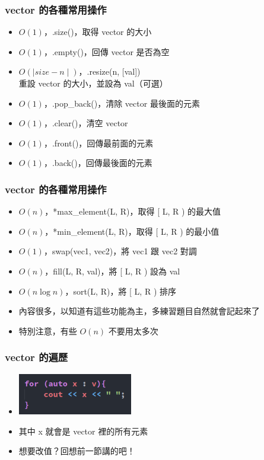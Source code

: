 \documentclass{beamer}
\begin{document}
\begin{frame}
    \frametitle{vector 的各種常用操作}
    \begin{itemize}
        \item $O(1)$，.size()，取得 vector 的大小
        \item $O(1)$，.empty()，回傳 vector 是否為空
        \item $O(\mid size-n \mid )$，.resize({\color[rgb]{1,0,0}n}, {\color[rgb]{1,0,0}[val]})\\
        重設 vector 的大小，並設為 val（可選）
        \item $O(1)$，.pop\_back()，清除 vector 最後面的元素
        \item $O(1)$，.clear()，清空 vector
        \item $O(1)$，.front()，回傳最前面的元素
        \item $O(1)$，.back()，回傳最後面的元素
    \end{itemize}
\end{frame}

\begin{frame}
    \frametitle{vector 的各種常用操作}
    \begin{itemize}
        \item $O(n)$，*max\_element({\color[rgb]{1,0,0}L}, {\color[rgb]{1,0,0}R})，取得 [ L, R ) 的最大值
        \item $O(n)$，*min\_element({\color[rgb]{1,0,0}L}, {\color[rgb]{1,0,0}R})，取得 [ L, R ) 的最小值
        \item $O(1)$，swap({\color[rgb]{1,0,0}vec1}, {\color[rgb]{1,0,0}vec2})，將 vec1 跟 vec2 對調
        \item $O(n)$，fill({\color[rgb]{1,0,0}L}, {\color[rgb]{1,0,0}R}, {\color[rgb]{1,0,0}val})，將 [ L, R ) 設為 val
        \item $O(n \log n)$，sort({\color[rgb]{1,0,0}L}, {\color[rgb]{1,0,0}R})，將 [ L, R ) 排序
        \vspace{0.5cm}
        \item 內容很多，以知道有這些功能為主，多練習題目自然就會記起來了
        \item 特別注意，有些 $O(n)$ 不要用太多次
    \end{itemize}
\end{frame}

\begin{frame}
    \frametitle{vector 的遍歷}
    \begin{itemize}
        \item \includegraphics[width=5.0cm]{img/img_4.png}
        \item 其中 x 就會是 vector 裡的所有元素
        \item 想要改值？回想前一節講的吧！
    \end{itemize}
\end{frame}
\end{document}
